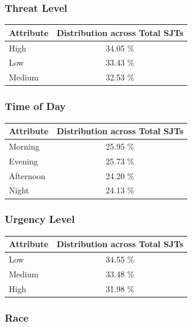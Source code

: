 \documentclass[11pt]{article}
\begin{document}
\subsubsection{Threat Level}

\begin{table}[H]
\centering
\begin{tabularx}{\columnwidth}{|X|c|}
\hline
\textbf{Attribute} & \textbf{Distribution across Total SJTs} \\
\hline
High & 34.05 \% \\
\hline
Low & 33.43 \%\\
\hline
Medium & 32.53 \%\\
\hline
\end{tabularx}
\end{table}

\subsubsection{Time of Day}

\begin{table}[H]
\centering
\begin{tabularx}{\columnwidth}{|X|c|}
\hline
\textbf{Attribute} & \textbf{Distribution across Total SJTs} \\
\hline
Morning & 25.95 \% \\
\hline
Evening & 25.73 \%\\
\hline
Afternoon & 24.20 \%\\
\hline
Night & 24.13 \%\\
\hline
\end{tabularx}
\end{table}

\subsubsection{Urgency Level}

\begin{table}[H]
\centering
\begin{tabularx}{\columnwidth}{|X|c|}
\hline
\textbf{Attribute} & \textbf{Distribution across Total SJTs} \\
\hline
Low & 34.55 \% \\
\hline
Medium & 33.48 \%\\
\hline
High & 31.98 \%\\
\hline
\end{tabularx}
\end{table}

\subsubsection{Race}
\end{document}
